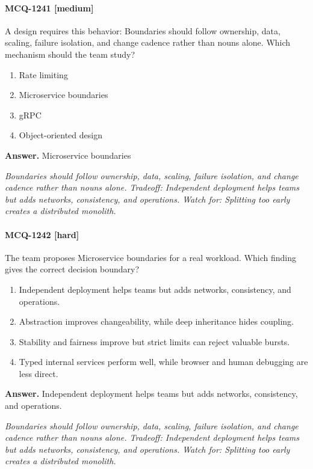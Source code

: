 \paragraph{MCQ-1241 [medium]} A design requires this behavior: Boundaries should follow ownership, data, scaling, failure isolation, and change cadence rather than nouns alone. Which mechanism should the team study?
\begin{enumerate}[label=\Alph*.]
\item Rate limiting
\item Microservice boundaries
\item gRPC
\item Object-oriented design
\end{enumerate}
\noindent\textbf{Answer.} Microservice boundaries
\par\textit{Boundaries should follow ownership, data, scaling, failure isolation, and change cadence rather than nouns alone. Tradeoff: Independent deployment helps teams but adds networks, consistency, and operations. Watch for: Splitting too early creates a distributed monolith.}
\paragraph{MCQ-1242 [hard]} The team proposes Microservice boundaries for a real workload. Which finding gives the correct decision boundary?
\begin{enumerate}[label=\Alph*.]
\item Independent deployment helps teams but adds networks, consistency, and operations.
\item Abstraction improves changeability, while deep inheritance hides coupling.
\item Stability and fairness improve but strict limits can reject valuable bursts.
\item Typed internal services perform well, while browser and human debugging are less direct.
\end{enumerate}
\noindent\textbf{Answer.} Independent deployment helps teams but adds networks, consistency, and operations.
\par\textit{Boundaries should follow ownership, data, scaling, failure isolation, and change cadence rather than nouns alone. Tradeoff: Independent deployment helps teams but adds networks, consistency, and operations. Watch for: Splitting too early creates a distributed monolith.}
